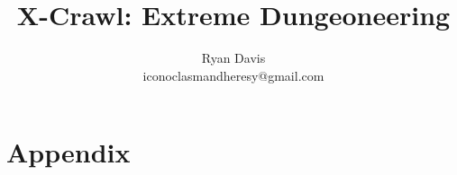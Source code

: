 \documentclass[letterpaper,10pt,twocolumn,openany]{book}
\author{Ryan Davis\\iconoclasmandheresy@gmail.com}
\title{X-Crawl: Extreme Dungeoneering}
\begin{document}
\maketitle
\frontmatter
\tableofcontents

\mainmatter
%
%
\backmatter
\part{Appendix}
\end{document}
